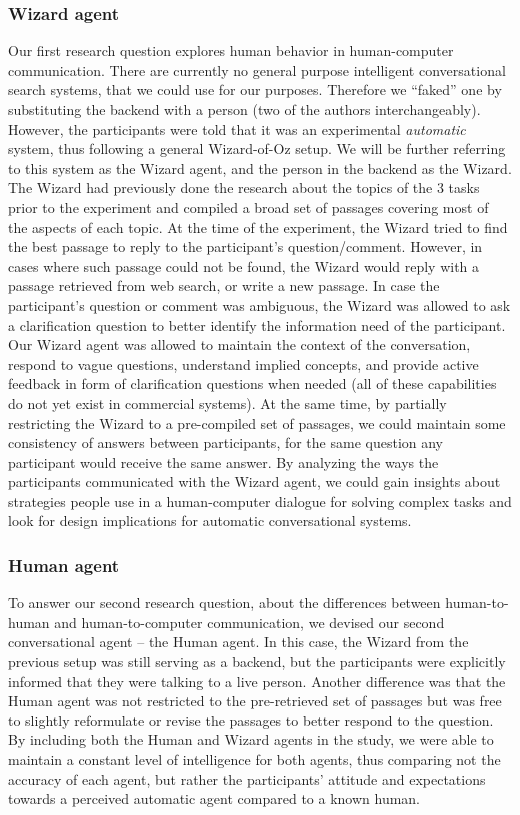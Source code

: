 \subsubsection{Wizard agent}
\label{section:conversation:user-study:design:wizard}
Our first research question explores human behavior in human-computer communication.
There are currently no general purpose intelligent conversational search systems, that we could use for our purposes.
Therefore we ``faked'' one by substituting the backend with a person (two of the authors interchangeably).
However, the participants were told that it was an experimental \textit{automatic} system, thus following a general Wizard-of-Oz setup.
We will be further referring to this system as the Wizard agent, and the person in the backend as the Wizard.
The Wizard had previously done the research about the topics of the 3 tasks prior to the experiment and compiled a broad set of passages covering most of the aspects of each topic.
At the time of the experiment, the Wizard tried to find the best passage to reply to the participant's question/comment.
However, in cases where such passage could not be found, the Wizard would reply with a passage retrieved from web search, or write a new passage.
In case the participant's question or comment was ambiguous, the Wizard was allowed to ask a clarification question to better identify the information need of the participant.
Our Wizard agent was allowed to maintain the context of the conversation, respond to vague questions, understand implied concepts, and provide active feedback in form of clarification questions when needed (all of these capabilities do not yet exist in commercial systems).
At the same time, by partially restricting the Wizard to a pre-compiled set of passages, we could maintain some consistency of answers between participants, \ie for the same question any participant would receive the same answer.
By analyzing the ways the participants communicated with the Wizard agent, we could gain insights about strategies people use in a human-computer dialogue for solving complex tasks and look for design implications for automatic conversational systems.

\subsubsection{Human agent}
\label{section:conversation:user-study:design:human}
To answer our second research question, about the differences between human-to-human and human-to-computer communication, we devised our second conversational agent -- the Human agent.
In this case, the Wizard from the previous setup was still serving as a backend, but the participants were explicitly informed that they were talking to a live person.
Another difference was that the Human agent was not restricted to the pre-retrieved set of passages but was free to slightly reformulate or revise the passages to better respond to the question.
By including both the Human and Wizard agents in the study, we were able to maintain a constant level of intelligence for both agents, thus comparing not the accuracy of each agent, but rather the participants' attitude and expectations towards a perceived automatic agent compared to a known human.

